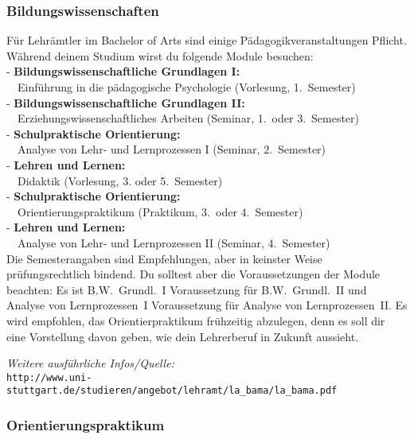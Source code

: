 \subsubsection{Bildungswissenschaften}

Für Lehrämtler im Bachelor of Arts
sind einige Pädagogikveranstaltungen Pflicht.
Während deinem Studium wirst du folgende Module besuchen:\\[6pt]
- {\bf Bildungswissenschaftliche Grundlagen I:}\\
\ \ Einführung in die pädagogische Psychologie (Vorlesung, 1.~Semester)\\[2pt]
- {\bf Bildungswissenschaftliche Grundlagen II:}\\
\ \ Erziehungswissenschaftliches Arbeiten (Seminar, 1.~oder 3.~Semester)\\[2pt]
- {\bf Schulpraktische Orientierung:}\\
\ \ Analyse von Lehr- und Lernprozessen I (Seminar, 2.~Semester)\\[2pt]
- {\bf Lehren und Lernen:}\\
\ \ Didaktik (Vorlesung, 3. oder 5.~Semester)\\[2pt]
- {\bf Schulpraktische Orientierung:}\\
\ \ Orientierungspraktikum (Praktikum, 3.~oder 4.~Semester)\\[2pt]
- {\bf Lehren und Lernen:}\\
\ \ Analyse von Lehr- und Lernprozessen II (Seminar, 4.~Semester)\\[2pt]

Die Semesterangaben sind Empfehlungen,
aber in keinster Weise prüfungsrechtlich bindend.
Du solltest aber die Voraussetzungen der Module beachten:
Es ist B.W.~Grundl.~I Voraussetzung für B.W.~Grundl.~II
und Analyse von Lernprozessen~I
Voraussetzung für Analyse von Lernprozessen~II.
Es wird empfohlen, das Orientierpraktikum frühzeitig abzulegen,
denn es soll dir eine Vorstellung davon geben,
wie dein Lehrerberuf in Zukunft aussieht.


{\it Weitere ausführliche Infos/Quelle:}\\
{\small\verb|http://www.uni-stuttgart.de/studieren/angebot/lehramt/la_bama/la_bama.pdf|}

\subsubsection{Orientierungspraktikum}

